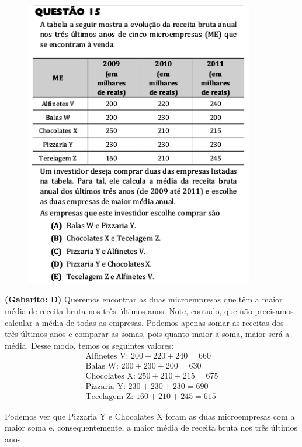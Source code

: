 \documentclass[a4paper]{article}
\begin{document}
\begin{figure}[H]
	\begin{center}
		\includegraphics[width=10cm]{L1Q15.png}
	\end{center}
\end{figure}
\par\textbf{(Gabarito: D)} Queremos encontrar as duas microempresas que têm a maior média de receita bruta nos três últimos anos. Note, contudo, que não precisamos calcular a média de todas as empresas. Podemos apenas somar as receitas dos três últimos anos e comparar as somas, pois quanto maior a soma, maior será a média. Desse modo, temos os seguintes valores:
\begin{align*}
\text{Alfinetes V: }200+220+240 = 660 \\
\text{Balas W: }200+230+200 = 630 \\
\text{Chocolates X: }250+210+215 = 675 \\
\text{Pizzaria Y: }230+230+230 = 690 \\
\text{Tecelagem Z: }160+210+245 = 615
\end{align*}
\par\vspace{0.3cm} Podemos ver que Pizzaria Y e Chocolates X foram as duas microempresas com a maior soma e, consequentemente, a maior média de receita bruta nos três últimos anos. 
\end{document}
